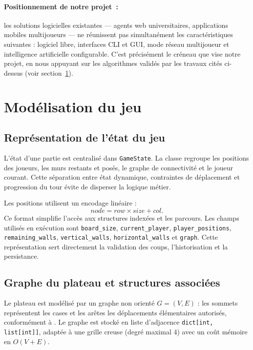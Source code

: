 \documentclass[a4paper]{article}
\begin{document}
\paragraph{Positionnement de notre projet~:}
les solutions logicielles existantes --- agents web universitaires,
applications mobiles multijoueurs --- ne réunissent pas simultanément
les caractéristiques suivantes : logiciel libre, interfaces CLI et GUI,
mode réseau multijoueur et intelligence artificielle configurable. C'est
précisément le créneau que vise notre projet, en nous appuyant sur les
algorithmes validés par les travaux cités ci-dessus
(voir section~\ref{sec:algos}).

\section{Modélisation du jeu}
\label{sec:algos}

\subsection{Représentation de l'état du jeu}

L'état d'une partie est centralisé dans \texttt{GameState}. La classe regroupe
les positions des joueurs, les murs restants et posés, le graphe de
connectivité et le joueur courant. Cette séparation entre état dynamique,
contraintes de déplacement et progression du tour évite de disperser la logique
métier.

Les positions utilisent un encodage linéaire :
\[
\textit{node} = \textit{row} \times \textit{size} + \textit{col}.
\]
Ce format simplifie l'accès aux structures indexées et les parcours. Les champs
utilisés en exécution sont \texttt{board\_size}, \texttt{current\_player},
\texttt{player\_positions}, \texttt{remaining\_walls},
\texttt{vertical\_walls}, \texttt{horizontal\_walls} et \texttt{graph}. Cette
représentation sert directement la validation des coups, l'historisation et la
persistance.

\subsection{Graphe du plateau et structures associées}

Le plateau est modélisé par un graphe non orienté $G=(V,E)$ : les sommets
représentent les cases et les arêtes les déplacements élémentaires autorisés,
conformément à \cite{glendenning2005quoridor,mertens2012quoridor}. Le graphe
est stocké en liste d'adjacence \texttt{dict[int, list[int]]}, adaptée à une
grille creuse (degré maximal $4$) avec un coût mémoire en $O(V+E)$.
\end{document}
